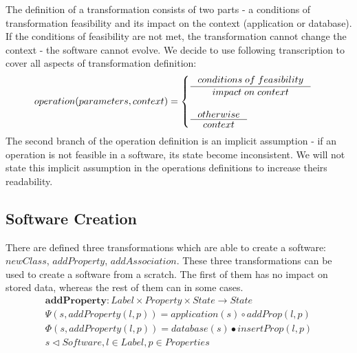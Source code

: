 \documentclass[11pt]{article}
\begin{document}
The definition of a transformation consists of two parts - a conditions of transformation feasibility and its impact on the context (application or database). If the conditions of feasibility are not met, the transformation cannot change the context - the software cannot evolve.  We decide to use following transcription to cover all aspects of transformation definition:
\begin{align*}
operation(parameters, context) = \begin{cases}
  \inference{conditions \; of \; feasibility}{impact \; on \; context}\\ \\
  \inference{otherwise}{context}
 \end{cases}
\end{align*}
The second branch of the operation definition is an implicit assumption - if an operation is not feasible in a software, its state become inconsistent. We will not state this implicit assumption in the operations definitions to increase theirs readability.


\subsection{Software Creation}
There are defined three transformations which are able to create a software: $newClass$, $addProperty$, $addAssociation$. These three transformations can be used to create a software from a scratch. The first of them has no impact on stored data, whereas the rest of them can in some cases.
\begin{align*}
\mathbf{addProperty} : Label \times Property \times State \rightarrow State \\
\Psi(s, addProperty(l, p)) = application(s) \circ addProp(l,p) \\
\Phi(s, addProperty(l, p)) = database(s) \bullet insertProp(l, p) \\
s \lhd Software, l \in Label, p \in Properties
\end{align*}
\end{document}
